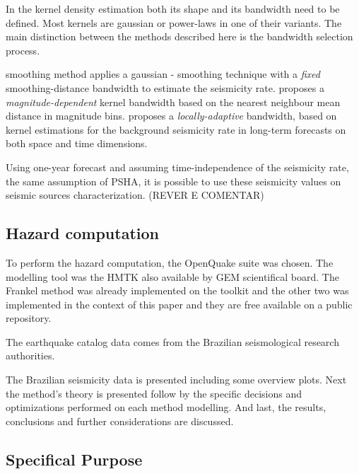 \documentclass[draft, grl]{agutex}
\begin{document}
\begin{article}
In the kernel density estimation both its shape and its bandwidth need to be defined. Most kernels are gaussian or power-laws in one of their variants. The main distinction between the methods described here is the bandwidth selection process.

\citet{frankel_1995} smoothing method applies a gaussian \citet{nadaraya_1964}-\citet{watson_1964} smoothing technique with a \emph{fixed} smoothing-distance bandwidth to estimate the seismicity rate. \citet{woo_1996} proposes a \emph{magnitude-dependent} kernel bandwidth based on the nearest neighbour mean distance in magnitude bins. \citet{helmstetter_2012} proposes a \emph{locally-adaptive} bandwidth, based on kernel estimations for the background seismicity rate in long-term forecasts on both space and time dimensions.

Using one-year forecast and assuming time-independence of the seismicity rate, the same assumption of PSHA, it is possible to use these seismicity values on seismic sources characterization. (REVER E COMENTAR)



\subsection{Hazard computation}

To perform the hazard computation, the OpenQuake suite was chosen. The modelling tool was the HMTK also available by GEM scientifical board. The Frankel method was already implemented on the toolkit and the other two was implemented in the context of this paper and they are free available on a public repository.

The earthquake catalog data comes from the Brazilian seismological research authorities.

The Brazilian seismicity data is presented including some overview plots. Next the method's theory is presented follow by the specific decisions and optimizations performed on each method modelling. And last, the results, conclusions and further considerations are discussed.


\subsection{Specifical Purpose}




%
%


\end{article}
\end{document}
